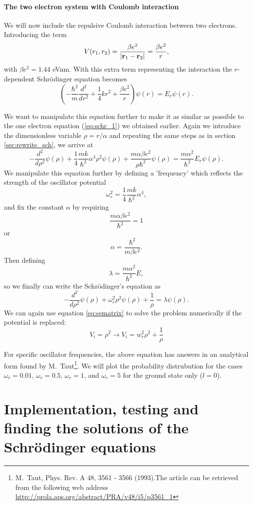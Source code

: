 \documentclass[11pt,a4wide]{article}
\begin{document}
\subsection{The two electron system with Coulomb interaction}
We will now include the repulsive Coulomb interaction between two electrons. Introducing the term
\[
V(r_1,r_2) = \frac{\beta e^2}{|{\bf r}_1-{\bf r}_2|}=\frac{\beta e^2}{r},
\]
with $\beta e^2=1.44$ eVnm. With this extra term representing the interaction the $r$-dependent Schr\"odinger equation becomes
\[
\left(  -\frac{\hbar^2}{m} \frac{d^2}{dr^2}+ \frac{1}{4}k r^2+\frac{\beta e^2}{r}\right)\psi(r)  = E_r \psi(r).
\]

We want to manipulate this equation further to make it as similar as possible to the one electron equation (\ref{eq:schr_1}) we obtained earlier. Again we introduce the dimensionless variable $\rho = r/\alpha$ and repeating the same steps as in section \ref{sec:rewrite_sch}, we arrive at 
\[
  -\frac{d^2}{d\rho^2} \psi(\rho) 
       + \frac{1}{4}\frac{mk}{\hbar^2} \alpha^4\rho^2\psi(\rho)+\frac{m\alpha \beta e^2}{\rho\hbar^2}\psi(\rho)  = 
\frac{m\alpha^2}{\hbar^2}E_r \psi(\rho) .
\]
We manipulate this equation further by defining a 'frequency' which reflects the strength of the oscillator potential
\[
\omega_r^2=\frac{1}{4}\frac{mk}{\hbar^2} \alpha^4,
\]
and fix the constant $\alpha$ by requiring 
\[
\frac{m\alpha \beta e^2}{\hbar^2}=1
\]
or 
\[
\alpha = \frac{\hbar^2}{m\beta e^2}.
\]
Then defining 
\[
\lambda = \frac{m\alpha^2}{\hbar^2}E,
\]
so we finally can write the Schr\"odinger's equation as
\begin{equation}
  -\frac{d^2}{d\rho^2} \psi(\rho) + \omega_r^2\rho^2\psi(\rho) +\frac{1}{\rho} = \lambda \psi(\rho).
  \label{eq: sch_2e_wCol}
\end{equation}
We can again use equation \ref{eq:sematrix} to solve the problem numerically if the potential is replaced:
\[
V_i = \rho^2 \rightarrow V_i = w_r^2\rho^2 + \frac{1}{\rho}
\]

For specific oscillator frequencies, the above equation has answers in an analytical form found by M.~Taut\footnote{M.~Taut, Phys. Rev. A 48, 3561 - 3566 (1993).The article can be retrieved from the following web address \url{http://prola.aps.org/abstract/PRA/v48/i5/p3561_1}}. We will plot the probability distrubution for the cases $\omega_r = 0.01$, $\omega_r = 0.5$, $\omega_r =1$, and $\omega_r = 5$ for the ground state only ($l=0$).



\newpage
\part{Implementation, testing and finding the solutions of the Schr\"odinger equations}
\end{document}
